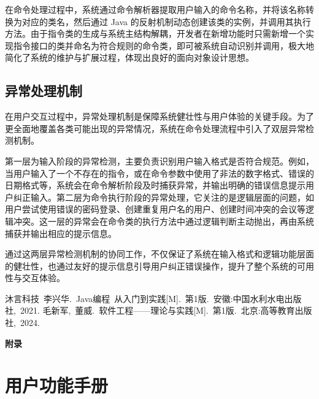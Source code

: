 \documentclass[a4paper, twoside, utf8]{ctexart}
\begin{document}
    在命令处理过程中，系统通过命令解析器提取用户输入的命令名称，并将该名称转换为对应的类名，然后通过 Java 的反射机制动态创建该类的实例，并调用其执行方法。由于指令类的生成与系统主结构解耦，开发者在新增功能时只需新增一个实现指令接口的类并命名为符合规则的命令类，即可被系统自动识别并调用，极大地简化了系统的维护与扩展过程，体现出良好的面向对象设计思想。

    \subsection{异常处理机制}

    在用户交互过程中，异常处理机制是保障系统健壮性与用户体验的关键手段。为了更全面地覆盖各类可能出现的异常情况，系统在命令处理流程中引入了双层异常检测机制。

    第一层为输入阶段的异常检测，主要负责识别用户输入格式是否符合规范。例如，当用户输入了一个不存在的指令，或在命令参数中使用了非法的数字格式、错误的日期格式等，系统会在命令解析阶段及时捕获异常，并输出明确的错误信息提示用户纠正输入。第二层为命令执行阶段的异常处理，它关注的是逻辑层面的问题，如用户尝试使用错误的密码登录、创建重复用户名的用户、创建时间冲突的会议等逻辑冲突。这一层的异常会在命令类的执行方法中通过逻辑判断主动抛出，再由系统捕获并输出相应的提示信息。

    通过这两层异常检测机制的协同工作，不仅保证了系统在输入格式和逻辑功能层面的健壮性，也通过友好的提示信息引导用户纠正错误操作，提升了整个系统的可用性与交互体验。
	
    \begin{thebibliography}{99}
         沐言科技\ 李兴华.\ Java编程\ 从入门到实践[M].\ 第1版.\ 安徽:中国水利水电出版社,\ 2021.
         毛新军,\ 董威.\ 软件工程——理论与实践[M].\ 第1版.\ 北京:高等教育出版社,\ 2024.
    \end{thebibliography}
	
	\newpage
	\appendix
	\centerline{\Large{\textbf{附录}}}

    \section{用户功能手册}
\end{document}
